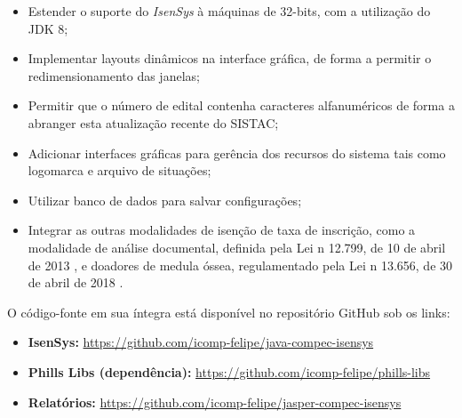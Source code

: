\documentclass[
	12pt,			%
	openright,		%
	oneside,	
	a4paper,		%
	english,		%
	brazil			%
]{abntex2/abntex2}  %
\begin{document}
			\begin{itemize}
				
				\item Estender o suporte do \textit{IsenSys} à máquinas de 32-bits, com a utilização do JDK 8;
				\item Implementar layouts dinâmicos na interface gráfica, de forma a permitir o redimensionamento das janelas;
				\item Permitir que o número de edital contenha caracteres alfanuméricos de forma a abranger esta atualização recente do SISTAC;
				\item Adicionar interfaces gráficas para gerência dos recursos do sistema tais como logomarca e arquivo de situações;
				\item Utilizar banco de dados para salvar configurações;
				\item Integrar as outras modalidades de isenção de taxa de inscrição, como a modalidade de análise documental, definida pela Lei n{\textdegree} 12.799, de 10 de abril de 2013 \cite{lei-12799}, e doadores de medula óssea, regulamentado pela Lei n{\textdegree} 13.656, de 30 de abril de 2018 \cite{lei-13656}.
				
			\end{itemize}
			
			O código-fonte em sua íntegra está disponível no repositório GitHub sob os links:
			
			\begin{itemize}
				
				\item \textbf{IsenSys:} \url{https://github.com/icomp-felipe/java-compec-isensys}
				\item \textbf{Phills Libs (dependência):} \url{https://github.com/icomp-felipe/phills-libs}
				\item \textbf{Relatórios:} \url{https://github.com/icomp-felipe/jasper-compec-isensys}
				
			\end{itemize}

	\postextual

	
\end{document}
